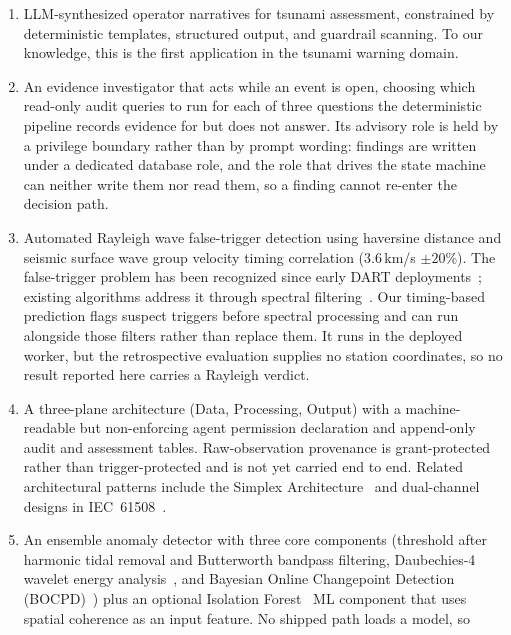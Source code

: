 \documentclass{article}
\begin{document}
\begin{enumerate}
  \item LLM-synthesized operator narratives for
    tsunami assessment, constrained by deterministic templates,
    structured output, and guardrail scanning. To our knowledge,
    this is the first application in the tsunami warning domain.
  \item An evidence investigator that acts while an event is open,
    choosing which read-only audit queries to run for each of three
    questions the deterministic pipeline records evidence for but does
    not answer. Its advisory role is held by a privilege boundary rather
    than by prompt wording: findings are written under a dedicated
    database role, and the role that drives the state machine can
    neither write them nor read them, so a finding cannot re-enter
    the decision path.
  \item Automated Rayleigh wave false-trigger
    detection using haversine distance and seismic surface wave
    group velocity timing correlation ($3.6$\,km/s $\pm 20\%$).
    The false-trigger problem has been recognized since early DART
    deployments~\citep{mofjeld1997tsunami}; existing algorithms address
    it through spectral filtering~\citep{chierici2017new, angeli2025tsunami}.
    Our timing-based prediction flags suspect triggers before spectral
    processing and can run alongside those filters rather than replace
    them.  It runs in the deployed worker, but the retrospective
    evaluation supplies no station coordinates, so no result reported
    here carries a Rayleigh verdict.
  \item A three-plane architecture (Data, Processing, Output) with a
    machine-readable but non-enforcing agent permission declaration and
    append-only audit and assessment tables.  Raw-observation
    provenance is grant-protected rather than trigger-protected and is
    not yet carried end to end. Related architectural patterns include the
    Simplex Architecture~\citep{sha2001using} and dual-channel
    designs in IEC~61508~\citep{iec61508}.
  \item An ensemble anomaly detector with three core components
    (threshold after harmonic tidal removal and Butterworth bandpass
    filtering, Daubechies-4 wavelet energy
    analysis~\citep{daubechies1992ten}, and Bayesian Online Changepoint
    Detection (BOCPD)~\citep{adams2007bayesian}) plus an optional Isolation
    Forest~\citep{liu2008isolation} ML component that uses spatial
    coherence as an input feature.  No shipped path loads a model, so

\end{enumerate}
\end{document}

